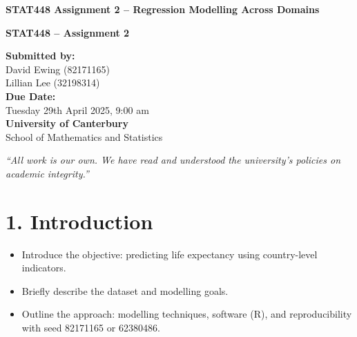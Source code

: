 \documentclass[11pt,a4paper]{article}
\begin{document}
\begin{titlepage}
    \centreing
    \vspace*{3cm}
    
    {\Huge\bfseries STAT448 Assignment 2 -- Regression Modelling Across Domains\par}
    \vspace{1.5cm}
    
    {\Large\bfseries STAT448 – Assignment 2\par}
    \vspace{2cm}
    
    \begin{flushleft}
        \textbf{Submitted by:}\\
        David Ewing (82171165)\\
        Lillian Lee (32198314)\\[1.5cm]

        \textbf{Due Date:}\\
        Tuesday 29th April 2025, 9:00 am\\[1.5cm]

        \textbf{University of Canterbury}\\
        School of Mathematics and Statistics\\[1cm]
    \end{flushleft}

    \vfill
    \begin{flushright}
        \textit{“All work is our own. We have read and understood the university's policies on academic integrity.”}
    \end{flushright}
\end{titlepage}

\onehalfspacing


\section*{1. Introduction}
\begin{itemize}
    \item Introduce the objective: predicting life expectancy using country-level indicators.
    \item Briefly describe the dataset and modelling goals.
    \item Outline the approach: modelling techniques, software (R), and reproducibility with seed 82171165 or 62380486.
\end{itemize}
\end{document}
